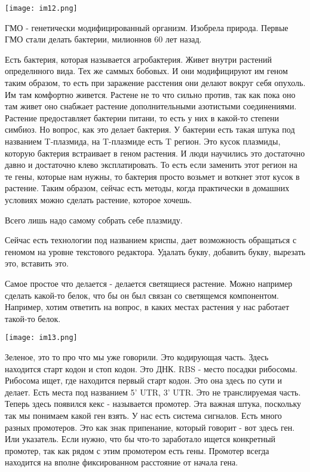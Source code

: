 \texttt{[image: im12.png]}

ГМО - генетически модифицированный организм. Изобрела природа. 
Первые ГМО стали делать бактерии, милионнов 60 лет назад. 

Есть бактерия, которая называется агробактерия. Живет внутри 
растений определнного вида. Тех же 
саммых бобовых. И они модифицируют им геном таким образом, 
то есть при заражение расстения они делают вокруг 
себя опухоль. Им там комфортно живется. Растене
не то что сильно против, так как пока оно
там живет оно снабжает
растение дополнительными азотистыми соединениями. Растение
предоставляет бактерии питани, то есть
у них в какой-то степени симбиоз. Но вопрос, как это
делает бактерия. У бактерии есть
такая штука под названием T-плазмида, на T-плазмиде есть
T регион. Это кусок плазмиды, которую бактерия
встраивает в геном растения. И люди научились это
достаточно давно и достаточно клево эксплатировать. То есть
если заменить этот регион на те гены, которые нам нужны, то бактерия просто возьмет
и воткнет этот кусок в растение. Таким образом,
сейчас есть методы, когда практически в домашних условиях
можно сделать растение, которое хочешь.

Всего лишь надо самому собрать себе плазмиду.

Сейчас есть технологии под названием криспы, дает
возможность обращаться с геномом на уровне текстового редактора.
Удалать букву, добавить букву, вырезать это,
вставить это.

Самое простое что делается - делается
светящиеся растение. Можно например сделать
какой-то белок, что бы он был связан со светящемся
компонентом. Например, хотим
ответить на вопрос, в каких местах
растения у нас работает такой-то белок.

    
\texttt{[image: im13.png]}

Зеленое, это то про что 
мы уже говорили. Это кодирующая часть. Здесь 
находится старт кодон и стоп кодон. 
Это ДНК. RBS - место посадки рибосомы. Рибосома 
ищет, где находится первый старт кодон. Это она здесь по 
сути и делает. Есть места под
названием 5' UTR, 3' UTR. Это не транслируемая часть. 
Теперь здесь появился кекс - называется промотер. Эта 
важная штука, поскольку так мы понимаем какой ген взять. 
У нас есть система сигналов. Есть много разных 
промотеров. Это как знак припенание, который говорит - вот 
здесь ген. Или указатель. Если нужно, что бы 
что-то заработало ищется конкретный промотер, так
как рядом с этим промотером есть гены. Промотер 
всегда находится на вполне фиксированном расстояние от начала гена. 


